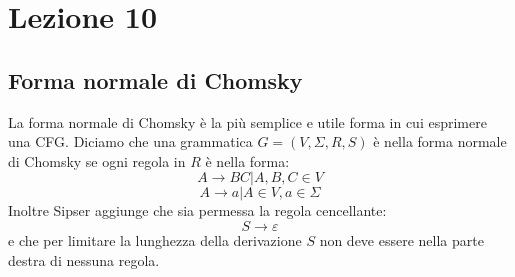 
\section{Lezione 10}
\subsection{Forma normale di Chomsky}
La forma normale di Chomsky \`e la pi\`u semplice e utile forma in cui esprimere una CFG.
Diciamo che una grammatica $G = (V, \Sigma, R, S)$ \`e nella forma normale di Chomsky se ogni regola in $R$ \`e nella forma: 
\[
	A \to BC | A, B, C \in V
\]
\[
	A \to a | A \in V, a \in \Sigma
\]
Inoltre Sipser aggiunge che sia permessa la regola cencellante:
\[
	S \to \varepsilon
\]
e che per limitare la lunghezza della derivazione $S$ non deve essere nella parte destra di nessuna regola.
